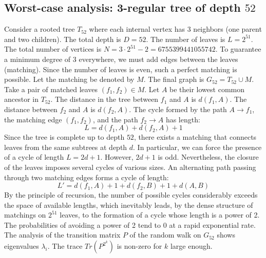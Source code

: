 \documentclass[11pt,a4paper]{article}
\begin{document}
\subsection{Worst-case analysis: 3-regular tree of depth $52$}
Consider a rooted tree $T_{52}$ where each internal vertex has 3 neighbors (one parent and two children).
The total depth is $D = 52$.
The number of leaves is $L = 2^{51}$.
The total number of vertices is $N = 3 \cdot 2^{51} - 2 = 6755399441055742$.
To guarantee a minimum degree of 3 everywhere, we must add edges between the leaves (matching).
Since the number of leaves is even, such a perfect matching is possible.
Let the matching be denoted by $M$. The final graph is $G_{52} = T_{52} \cup M$.
Take a pair of matched leaves $(f_1, f_2) \in M$.
Let $A$ be their lowest common ancestor in $T_{52}$.
The distance in the tree between $f_1$ and $A$ is $d(f_1, A)$.
The distance between $f_2$ and $A$ is $d(f_2, A)$.
The cycle formed by the path $A \to f_1$, the matching edge $(f_1, f_2)$, and the path $f_2 \to A$ has length:
$$ L = d(f_1, A) + d(f_2, A) + 1 $$
Since the tree is complete up to depth $52$, there exists a matching that connects leaves from the same subtrees at depth $d$.
In particular, we can force the presence of a cycle of length $L = 2d + 1$. However, $2d+1$ is odd.
Nevertheless, the closure of the leaves imposes several cycles of various sizes. An alternating path passing through two matching edges forms a cycle of length:
$$ L' = d(f_1, A) + 1 + d(f_2, B) + 1 + d(A, B) $$
By the principle of recursion, the number of possible cycles considerably exceeds the space of available lengths, which inevitably leads, by the dense structure of matchings on $2^{51}$ leaves, to the formation of a cycle whose length is a power of 2. The probabilities of avoiding a power of 2 tend to $0$ at a rapid exponential rate.
The analysis of the transition matrix $P$ of the random walk on $G_{52}$ shows eigenvalues $\lambda_i$. The trace $Tr(P^{2^k})$ is non-zero for $k$ large enough.
\end{document}

